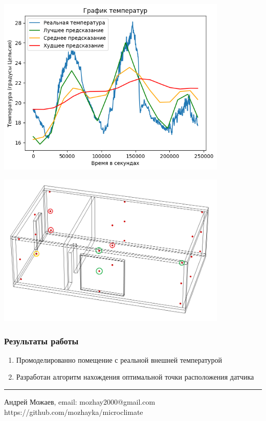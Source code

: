 \documentclass[14pt,aspectratio=169,hyperref={pdftex,unicode},xcolor=dvipsnames]{beamer}
\begin{document}
\begin{frame} \begin{center}
\includegraphics[width=11cm]{images/result.png}
\end{center} \end{frame}

\begin{frame} \begin{center}
\includegraphics[width=11cm]{images/interesting_points_result.png}
\end{center} \end{frame}



\begin{frame}
\frametitle{Результаты работы}

\begin{enumerate}
\item Промоделированно помещение с реальной внешней температурой
\item Разработан алгоритм нахождения оптимальной точки расположения датчика
\end{enumerate}

\vspace{5mm}\hrule\vspace{5mm}

\begin{center}
Андрей Можаев, email: mozhay2000@gmail.com\\
https://github.com/mozhayka/microclimate
\end{center}

\end{frame}
\end{document}
